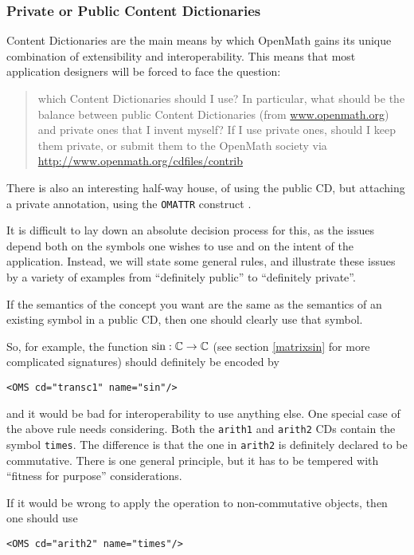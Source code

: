 \documentclass[keylogo]{openmath}
\begin{document}
\subsubsection{Private or Public Content Dictionaries}
Content Dictionaries are the main means by which OpenMath gains its
unique combination of extensibility and interoperability. This means
that most application designers will be forced to face the question:
\begin{quote}
  which Content Dictionaries should I use? In particular, what should
  be the balance between public Content Dictionaries (from
  \url{www.openmath.org}) and private ones that I invent myself? If I
  use private ones, should I keep them private, or submit them to the
  OpenMath society via
  \url{http://www.openmath.org/cdfiles/contrib}
\end{quote}
There is also an interesting half-way house, of using the public CD,
but attaching a private annotation, using the {\tt OMATTR} construct
\cite{OMstd}.
\par
It is difficult to lay down an absolute decision process for this, as
the issues depend both on the symbols one wishes to use and on the
intent of the application.  Instead, we will state some general rules,
and illustrate these issues by a variety of examples from ``definitely
public'' to ``definitely private''.  
\begin{rule}
  If the semantics of the concept you want are the same as the
  semantics of an existing symbol in a public CD, then one should
  clearly use that symbol.
\end{rule}
So, for example, the function $\sin:\mathbb{C} \rightarrow\mathbb{C}$ (see section
\ref{matrixsin} for more complicated signatures) should definitely be
encoded by
\begin{verbatim}
<OMS cd="transc1" name="sin"/>
\end{verbatim}
and it would be bad for interoperability to use anything else.
\label{commutativity}
One special case of the above rule needs considering. Both the {\tt arith1}
and {\tt arith2} CDs contain the symbol {\tt times}. The difference is that
the one in {\tt arith2} is definitely declared to be commutative. There is
one general principle, but it has to be tempered with ``fitness for
purpose'' considerations.
\begin{rule}
If it would be wrong to apply the operation to non-commutative objects,
then one should use 
\begin{verbatim}
<OMS cd="arith2" name="times"/>
\end{verbatim}
\end{rule}
\end{document}
